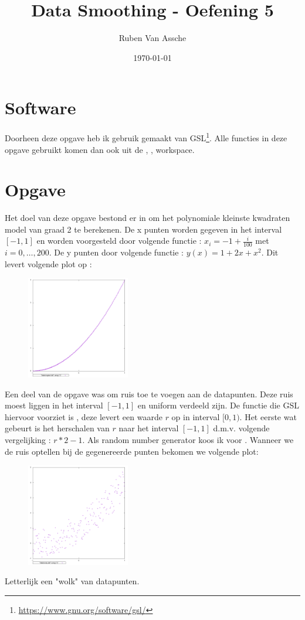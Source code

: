\documentclass[10pt,a4paper,twocolumn]{article}
\author{Ruben Van Assche}
\title{Data Smoothing - Oefening 5}
\date{\today}
\begin{document}
\maketitle
\section{Software}
Doorheen deze opgave heb ik gebruik gemaakt van GSL\footnote{\url{https://www.gnu.org/software/gsl/}}. Alle functies in deze opgave gebruikt komen dan ook uit de \texttt{} , \texttt{}, \texttt{} workspace.
\section{Opgave}
Het doel van deze opgave bestond er in om het polynomiale kleinste kwadraten model van graad 2 te berekenen. De x punten worden gegeven in het interval $[-1,1]$ en worden voorgesteld door volgende functie : $x_{i} = -1 + \frac{i}{100}$ met $i = 0,\hdots,200$. De y punten door volgende functie : $y(x) = 1 + 2x + x^{2}$. Dit levert volgende plot op :
\begin{figure}[H]
\includegraphics[width=0.4\textwidth]{original}
\end{figure}
Een deel van de opgave was om ruis toe te voegen aan de datapunten. Deze ruis moest liggen in het interval $[-1, 1]$ en uniform verdeeld zijn. De functie die GSL hiervoor voorziet is \texttt{}, deze levert een waarde $r$ op in interval $[0,1)$. Het eerste wat gebeurt is het herschalen van $r$ naar het interval $[-1, 1]$ d.m.v. volgende vergelijking : $r*2-1$. Als random number generator koos ik voor \texttt{}. Wanneer we de ruis optellen bij de gegenereerde punten bekomen we volgende plot:
\begin{figure}[H]
\includegraphics[width=0.4\textwidth]{noisy}
\end{figure}
Letterlijk een "wolk" van datapunten.
\end{document}
